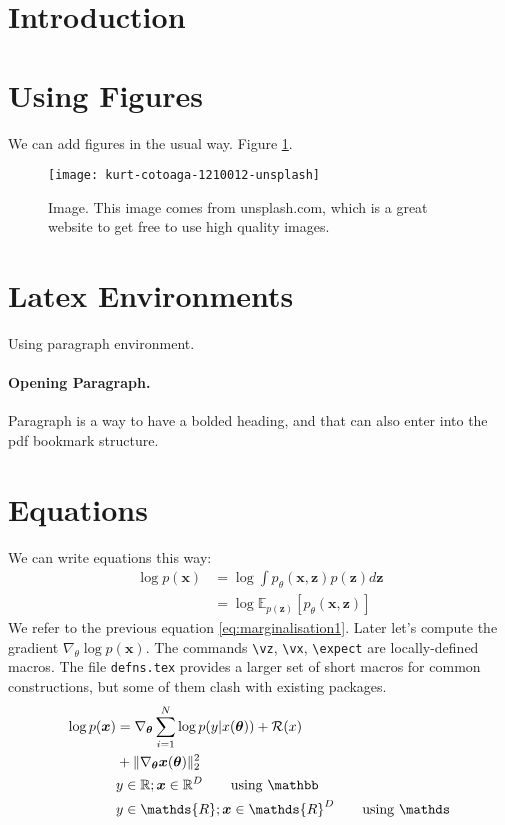 \newcommand{\expect}[2]{\mathds{E}_{{#1}} \left[ {#2} \right]}
\newcommand{\myvec}[1]{\boldsymbol{#1}}
\newcommand{\myvecsym}[1]{\boldsymbol{#1}}
\newcommand{\vx}{\myvec{x}}
\newcommand{\vy}{\myvec{y}}
\newcommand{\vz}{\myvec{z}}
\newcommand{\vtheta}{\myvecsym{\theta}}

\section{Introduction}

\kant[1]
\kant[2]
\kant[3]

\section{Using Figures}
%
We can add figures in the usual way. Figure \ref{fig:image1}.
\begin{figure}[t]
	\centering
	\texttt{[image: kurt-cotoaga-1210012-unsplash]}
	\caption{Image. This image comes from unsplash.com, which is a great website to get 
	free to use high quality images.}
	\label{fig:image1}
\end{figure}

\section{Latex Environments}
Using paragraph environment.
\paragraph{Opening Paragraph.} Paragraph is a way to have a bolded heading, and that can also 
enter into the pdf bookmark structure.

\section{Equations}
%
We can write equations this way:
\begin{align}
\log p(\vx) & = \log \int p_\theta(\vx,\vz) p(\vz) d\vz \nonumber \\
& = \log \expect{p(\vz)}{p_\theta(\vx,\vz)}
\label{eq:marginalisation1}
\end{align}
We refer to the previous equation \eqref{eq:marginalisation1}.
Later let's compute the gradient $\nabla_\theta \log p(\vx)$. The commands 
\verb|\vz|, \verb|\vx|, \verb|\expect| are locally-defined macros.
The file \texttt{defns.tex} provides a larger set of short macros for
common constructions, but some of them clash with existing packages.
\begin{align}
\log p(\vx) & = \nabla_{\vtheta} \sum_{i=1}^N \log p(y | x(\vtheta)) + \mathcal{R}(x) \nonumber \\
            & + \|\nabla_{\vtheta}\vx(\vtheta)\|^2_2 \\
            & y \in \mathbb{R}; \vx \in \mathbb{R}^D \qquad \text{using \texttt{\textbackslash mathbb}} \\
            & y \in \mathds{R}; \vx \in \mathds{R}^D \qquad \text{using \texttt{\textbackslash mathds}}
\label{eq:marginalisation2}
\end{align}

